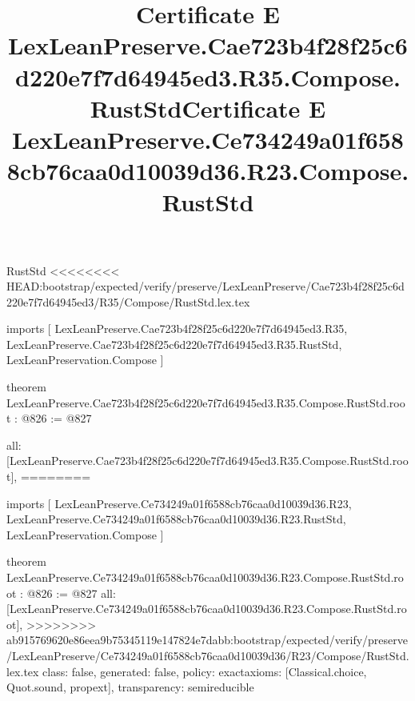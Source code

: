 \begin{lexlean}{RustStd}
<<<<<<<< HEAD:bootstrap/expected/verify/preserve/LexLeanPreserve/Cae723b4f28f25c6d220e7f7d64945ed3/R35/Compose/RustStd.lex.tex
\title{Certificate E LexLeanPreserve.Cae723b4f28f25c6d220e7f7d64945ed3.R35.Compose.RustStd}
\begin{coremodule}
imports [
  LexLeanPreserve.Cae723b4f28f25c6d220e7f7d64945ed3.R35,
  LexLeanPreserve.Cae723b4f28f25c6d220e7f7d64945ed3.R35.RustStd,
  LexLeanPreservation.Compose
]

theorem LexLeanPreserve.Cae723b4f28f25c6d220e7f7d64945ed3.R35.Compose.RustStd.root : @826 := @827 {
  all: [LexLeanPreserve.Cae723b4f28f25c6d220e7f7d64945ed3.R35.Compose.RustStd.root],
========
\title{Certificate E LexLeanPreserve.Ce734249a01f6588cb76caa0d10039d36.R23.Compose.RustStd}
\begin{coremodule}
imports [
  LexLeanPreserve.Ce734249a01f6588cb76caa0d10039d36.R23,
  LexLeanPreserve.Ce734249a01f6588cb76caa0d10039d36.R23.RustStd,
  LexLeanPreservation.Compose
]

theorem LexLeanPreserve.Ce734249a01f6588cb76caa0d10039d36.R23.Compose.RustStd.root : @826 := @827 {
  all: [LexLeanPreserve.Ce734249a01f6588cb76caa0d10039d36.R23.Compose.RustStd.root],
>>>>>>>> ab915769620e86eea9b75345119e147824e7dabb:bootstrap/expected/verify/preserve/LexLeanPreserve/Ce734249a01f6588cb76caa0d10039d36/R23/Compose/RustStd.lex.tex
  class: false,
  generated: false,
  policy: exact{axioms: [Classical.choice, Quot.sound, propext]},
  transparency: semireducible
}


\end{coremodule}}
\end{coremodule}
\end{lexlean}

